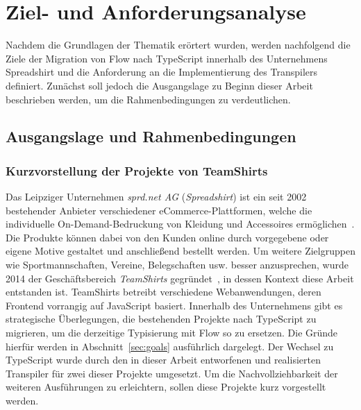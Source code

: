 \chapter{Ziel- und Anforderungsanalyse}
\label{chap:analysis}

Nachdem die Grundlagen der Thematik erörtert wurden, werden nachfolgend die Ziele der Migration von Flow nach TypeScript innerhalb des Unternehmens Spreadshirt und die Anforderung an die Implementierung des Transpilers definiert. Zunächst soll jedoch die Ausgangslage zu Beginn dieser Arbeit beschrieben werden, um die Rahmenbedingungen zu verdeutlichen.

\section{Ausgangslage und Rahmenbedingungen}
\label{sec:status-quo}

\subsection{Kurzvorstellung der Projekte von TeamShirts}
\label{sec:teamshirts-projects}

Das Leipziger Unternehmen \textit{sprd.net AG} (\textit{Spreadshirt}) ist ein seit 2002 bestehender Anbieter verschiedener eCommerce-Plattformen, welche die individuelle On-Demand-Bedruckung von Kleidung und Accessoires ermöglichen~\autocite{SPREADSHIRT:ABOUT}. Die Produkte können dabei von den Kunden online durch vorgegebene oder eigene Motive gestaltet und anschließend bestellt werden. Um weitere Zielgruppen wie Sportmannschaften, Vereine, Belegschaften usw. besser anzusprechen, wurde 2014 der Geschäftsbereich \textit{TeamShirts} gegründet~\autocite{TEAMSHIRTS:ABOUT}, in dessen Kontext diese Arbeit entstanden ist. TeamShirts betreibt verschiedene Webanwendungen, deren Frontend vorrangig auf JavaScript basiert. Innerhalb des Unternehmens gibt es strategische Überlegungen, die bestehenden Projekte nach TypeScript zu migrieren, um die derzeitige Typisierung mit Flow so zu ersetzen. Die Gründe hierfür werden in Abschnitt~\ref{sec:goals} ausführlich dargelegt. Der Wechsel zu TypeScript wurde durch den in dieser Arbeit entworfenen und realisierten Transpiler für zwei dieser Projekte umgesetzt. Um die Nachvollziehbarkeit der weiteren Ausführungen zu erleichtern, sollen diese Projekte kurz vorgestellt werden.

\vspace{-0.5\baselineskip}
